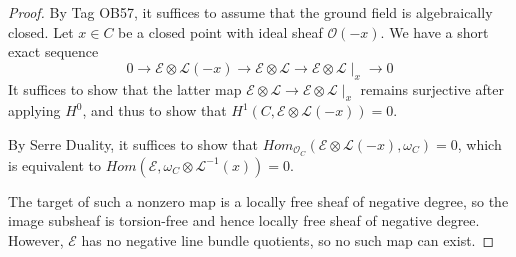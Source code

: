 \begin{proof}
By Tag OB57, it suffices to assume that the ground field is algebraically closed. 
Let $x\in C$ be a closed point with ideal sheaf $\mathcal{O}(-x)$. 
We have a short exact sequence
\begin{equation}
0\to\mathcal{E}\otimes\mathcal{L}(-x)\to\mathcal{E}\otimes\mathcal{L}\to\mathcal{E}\otimes\mathcal{L}\mid_x\to0
\end{equation}
It suffices to show that the latter map $\mathcal{E}\otimes\mathcal{L}\to\mathcal{E}\otimes\mathcal{L}\mid_x$ remains surjective after applying $H^0$, and thus to show that $H^1(C,\mathcal{E}\otimes\mathcal{L}(-x))=0$.

By Serre Duality, it suffices to show that $Hom_{\mathcal{O}_C}(\mathcal{E}\otimes\mathcal{L}(-x),\omega_C)=0$, which is equivalent to $Hom(\mathcal{E},\omega_C\otimes\mathcal{L}^{-1}(x))=0$.

The target of such a nonzero map is a locally free sheaf of negative degree, so the image subsheaf is torsion-free and hence locally free sheaf of negative degree. However, $\mathcal{E}$ has no negative line bundle quotients, so no such map can exist.
\end{proof}



